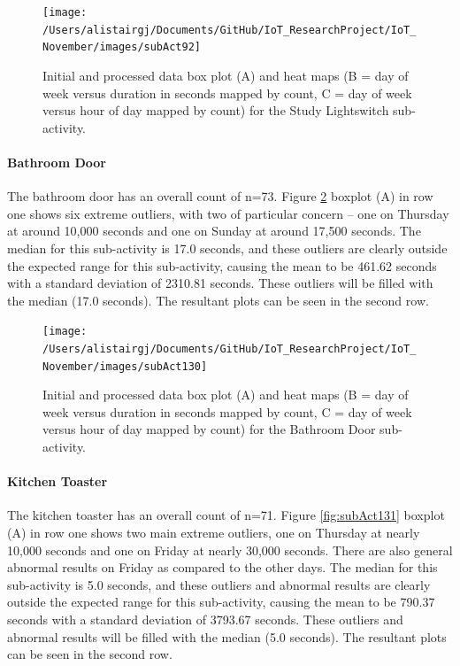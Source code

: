 \documentclass[11pt,]{article}
\let\oldparagraph\paragraph
\renewcommand{\paragraph}[1]{\oldparagraph{#1}\mbox{}}
\begin{document}
\begin{figure}[H]

{\centering \texttt{[image: /Users/alistairgj/Documents/GitHub/IoT\_ResearchProject/IoT\_November/images/subAct92]} 

}

\caption{Initial and processed data box plot (A) and heat maps (B = day of week versus duration in seconds mapped by count, C = day of week versus hour of day mapped by count) for the Study Lightswitch sub-activity.}\label{fig:subAct92}
\end{figure}

\hypertarget{bathroom-door}{%
\paragraph{Bathroom Door}\label{bathroom-door}}

The bathroom door has an overall count of n=73. Figure
\ref{fig:subAct130} boxplot (A) in row one shows six extreme outliers,
with two of particular concern -- one on Thursday at around 10,000
seconds and one on Sunday at around 17,500 seconds. The median for this
sub-activity is 17.0 seconds, and these outliers are clearly outside the
expected range for this sub-activity, causing the mean to be 461.62
seconds with a standard deviation of 2310.81 seconds. These outliers
will be filled with the median (17.0 seconds). The resultant plots can
be seen in the second row.

\begin{figure}[H]

{\centering \texttt{[image: /Users/alistairgj/Documents/GitHub/IoT\_ResearchProject/IoT\_November/images/subAct130]} 

}

\caption{Initial and processed data box plot (A) and heat maps (B = day of week versus duration in seconds mapped by count, C = day of week versus hour of day mapped by count) for the Bathroom Door sub-activity.}\label{fig:subAct130}
\end{figure}

\hypertarget{kitchen-toaster}{%
\paragraph{Kitchen Toaster}\label{kitchen-toaster}}

The kitchen toaster has an overall count of n=71. Figure
\ref{fig:subAct131} boxplot (A) in row one shows two main extreme
outliers, one on Thursday at nearly 10,000 seconds and one on Friday at
nearly 30,000 seconds. There are also general abnormal results on Friday
as compared to the other days. The median for this sub-activity is 5.0
seconds, and these outliers and abnormal results are clearly outside the
expected range for this sub-activity, causing the mean to be 790.37
seconds with a standard deviation of 3793.67 seconds. These outliers and
abnormal results will be filled with the median (5.0 seconds). The
resultant plots can be seen in the second row.
\end{document}
